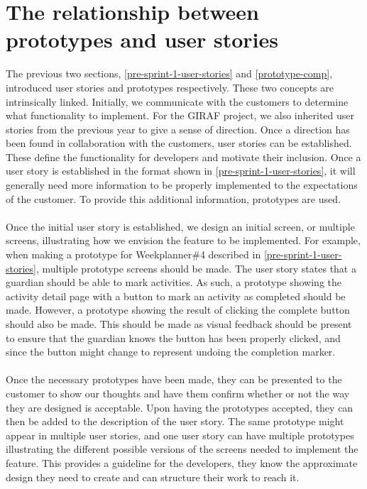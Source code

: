 \section{The relationship between prototypes and user stories}
The previous two sections, \autoref{pre-sprint-1-user-stories} and \autoref{prototype-comp}, introduced user stories and prototypes respectively.
These two concepts are intrinsically linked.
Initially, we communicate with the customers to determine what functionality to implement. 
For the GIRAF project, we also inherited user stories from the previous year to give a sense of direction.
Once a direction has been found in collaboration with the customers, user stories can be established.
These define the functionality for developers and motivate their inclusion.
Once a user story is established in the format shown in \autoref{pre-sprint-1-user-stories}, it will generally need more information to be properly implemented to the expectations of the customer.
To provide this additional information, prototypes are used.
\\\\
Once the initial user story is established, we design an initial screen, or multiple screens, illustrating how we envision the feature to be implemented.
For example, when making a prototype for Weekplanner\#4 described in \autoref{pre-sprint-1-user-stories}, multiple prototype screens should be made.
The user story states that a guardian should be able to mark activities. 
As such, a prototype showing the activity detail page with a button to mark an activity as completed should be made.
However, a prototype showing the result of clicking the complete button should also be made.
This should be made as visual feedback should be present to ensure that the guardian knows the button has been properly clicked, and since the button might change to represent undoing the completion marker.
\\\\
Once the necessary prototypes have been made, they can be presented to the customer to show our thoughts and have them confirm whether or not the way they are designed is acceptable.
Upon having the prototypes accepted, they can then be added to the description of the user story.
The same prototype might appear in multiple user stories, and one user story can have multiple prototypes illustrating the different possible versions of the screens needed to implement the feature.
This provides a guideline for the developers, they know the approximate design they need to create and can structure their work to reach it.
